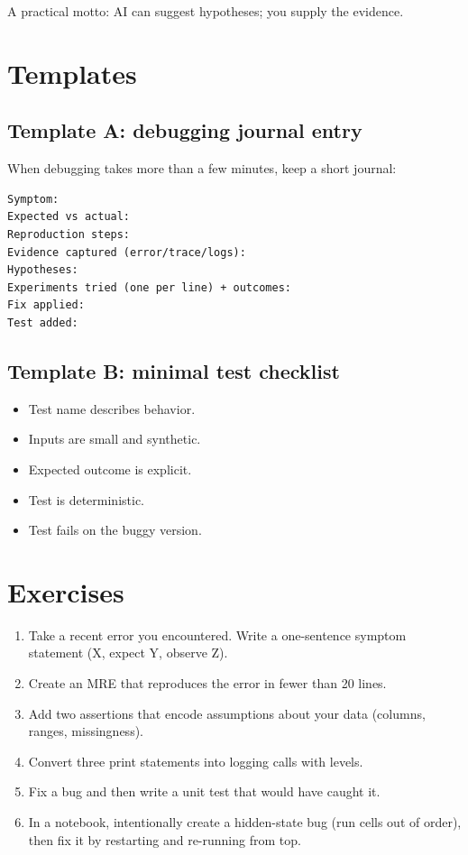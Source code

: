 A practical motto: AI can suggest hypotheses; you supply the evidence.

\section{Templates}
\subsection{Template A: debugging journal entry}
When debugging takes more than a few minutes, keep a short journal:
\begin{verbatim}
Symptom:
Expected vs actual:
Reproduction steps:
Evidence captured (error/trace/logs):
Hypotheses:
Experiments tried (one per line) + outcomes:
Fix applied:
Test added:
\end{verbatim}

\subsection{Template B: minimal test checklist}
\begin{itemize}[noitemsep]
  \item Test name describes behavior.
  \item Inputs are small and synthetic.
  \item Expected outcome is explicit.
  \item Test is deterministic.
  \item Test fails on the buggy version.
\end{itemize}

\section{Exercises}
\begin{enumerate}[noitemsep]
  \item Take a recent error you encountered. Write a one-sentence symptom statement (X, expect Y, observe Z).
  \item Create an MRE that reproduces the error in fewer than 20 lines.
  \item Add two assertions that encode assumptions about your data (columns, ranges, missingness).
  \item Convert three print statements into logging calls with levels.
  \item Fix a bug and then write a unit test that would have caught it.
  \item In a notebook, intentionally create a hidden-state bug (run cells out of order), then fix it by restarting and re-running from top.
\end{enumerate}

